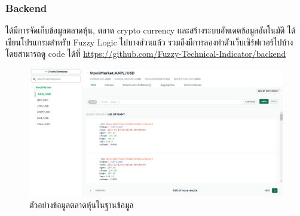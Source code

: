 \subsubsection{Backend}
ได้มีการจัดเก็บข้อมูลตลาดหุ้น, ตลาด crypto currency และสร้างระบบอัพเดตข้อมูลอัตโนมัติ ได้เขียนโปรแกรมสำหรับ Fuzzy Logic ไปบางส่วนแล้ว
รวมถึงมีการลองทำตัวเว็บเซิร์ฟเวอร์ไปบ้าง โดยสามารถดู code ได้ที่ \url{https://github.com/Fuzzy-Technical-Indicator/backend}

\begin{figure}[ht]
    \centering
    \includegraphics[width=\textwidth]{images/db_example.png}
    \caption{ตัวอย่างข้อมูลตลาดหุ้นในฐานข้อมูล}
\end{figure}
\pagebreak


